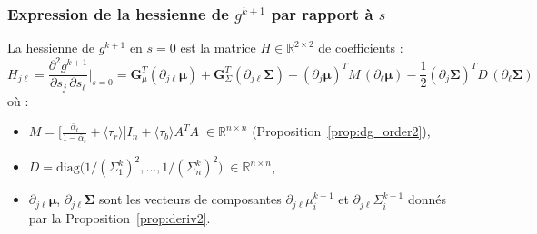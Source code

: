\documentclass[12pt]{article}
\newcommand{\alt}{\bar\alpha_t}
\begin{document}

\subsubsection*{Expression de la hessienne de $g^{k+1}$ par rapport à $s$}

\begin{propositionbox}[Hessienne de $g^{k+1}$]
\label{prop:hess_explicit}
La hessienne de $g^{k+1}$ en $s=0$ est la matrice $H \in \mathbb{R}^{2\times 2}$ de coefficients :
\begin{equation}
\boxed{
H_{j\ell} = \frac{\partial^2 g^{k+1}}{\partial s_j\,\partial s_\ell}\bigg|_{s=0} = \boldsymbol{G}_\mu^T(\partial_{j\ell}\boldsymbol{\mu}) + \boldsymbol{G}_\Sigma^T(\partial_{j\ell}\boldsymbol{\Sigma}) - (\partial_j\boldsymbol{\mu})^T M\,(\partial_\ell\boldsymbol{\mu}) - \frac{1}{2}(\partial_j\boldsymbol{\Sigma})^T D\,(\partial_\ell\boldsymbol{\Sigma})
}
\label{eq:hess_explicit}
\end{equation}
où :
\begin{itemize}
\item $M = \bigl[\frac{\alt}{1-\alt} + \langle\tau_r\rangle\bigr]I_n + \langle\tau_b\rangle A^TA \;\in\mathbb{R}^{n\times n}$ \;(Proposition~\ref{prop:dg_order2}),
\item $D = \mathrm{diag}\bigl(1/(\Sigma_1^k)^2, \ldots, 1/(\Sigma_n^k)^2\bigr) \;\in\mathbb{R}^{n\times n}$,
\item $\partial_{j\ell}\boldsymbol{\mu}$, $\partial_{j\ell}\boldsymbol{\Sigma}$ sont les vecteurs de composantes $\partial_{j\ell}\mu_i^{k+1}$ et $\partial_{j\ell}\Sigma_i^{k+1}$ donnés par la Proposition~\ref{prop:deriv2}.
\end{itemize}
\end{propositionbox}
\end{document}
